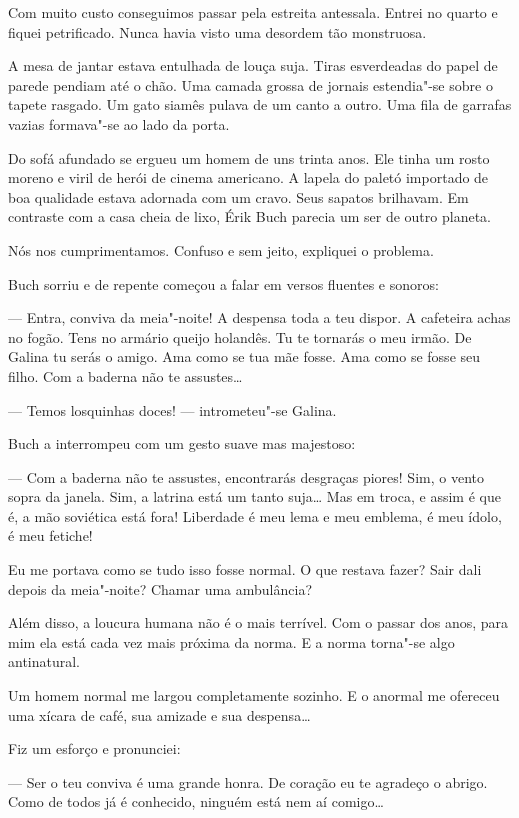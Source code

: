 Com muito custo conseguimos passar pela estreita antessala. Entrei no
quarto e fiquei petrificado. Nunca havia visto uma desordem tão
monstruosa.

A mesa de jantar estava entulhada de louça suja. Tiras esverdeadas do
papel de parede pendiam até o chão. Uma camada grossa de jornais
estendia"-se sobre o tapete rasgado. Um gato siamês pulava de um canto a
outro. Uma fila de garrafas vazias formava"-se ao lado da porta.

Do sofá afundado se ergueu um homem de uns trinta anos. Ele tinha um
rosto moreno e viril de herói de cinema americano. A lapela do paletó
importado de boa qualidade estava adornada com um cravo. Seus sapatos
brilhavam. Em contraste com a casa cheia de lixo, Érik Buch parecia um
ser de outro planeta.

Nós nos cumprimentamos. Confuso e sem jeito, expliquei o problema.

Buch sorriu e de repente começou a falar em versos fluentes e sonoros:

--- Entra, conviva da meia"-noite! A despensa toda a teu dispor. A
cafeteira achas no fogão. Tens no armário queijo holandês. Tu te
tornarás o meu irmão. De Galina tu serás o amigo. Ama como se tua mãe
fosse. Ama como se fosse seu filho. Com a baderna não te assustes\ldots{}

--- Temos losquinhas doces! --- intrometeu"-se Galina.

Buch a interrompeu com um gesto suave mas majestoso:

--- Com a baderna não te assustes, encontrarás desgraças piores! Sim, o
vento sopra da janela. Sim, a latrina está um tanto suja\ldots{} Mas em
troca, e assim é que é, a mão soviética está fora! Liberdade é meu lema
e meu emblema, é meu ídolo, é meu fetiche!

Eu me portava como se tudo isso fosse normal. O que restava fazer? Sair
dali depois da meia"-noite? Chamar uma ambulância?

Além disso, a loucura humana não é o mais terrível. Com o passar dos
anos, para mim ela está cada vez mais próxima da norma. E a norma
torna"-se algo antinatural.

Um homem normal me largou completamente sozinho. E o anormal me ofereceu
uma xícara de café, sua amizade e sua despensa\ldots{}

Fiz um esforço e pronunciei:

--- Ser o teu conviva é uma grande honra. De coração eu te agradeço o
abrigo. Como de todos já é conhecido, ninguém está nem aí comigo\ldots{}

